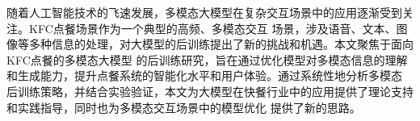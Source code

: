 随着人工智能技术的飞速发展，多模态大模型在复杂交互场景中的应用逐渐受到关注。KFC点餐场景作为一个典型的高频、多模态交互
场景，涉及语音、文本、图像等多种信息的处理，对大模型的后训练提出了新的挑战和机遇。本文聚焦于面向KFC点餐的多模态大模型
的后训练研究，旨在通过优化模型对多模态信息的理解和生成能力，提升点餐系统的智能化水平和用户体验。通过系统性地分析多模态
后训练策略，并结合实验验证，本文为大模型在快餐行业中的应用提供了理论支持和实践指导，同时也为多模态交互场景中的模型优化
提供了新的思路。
